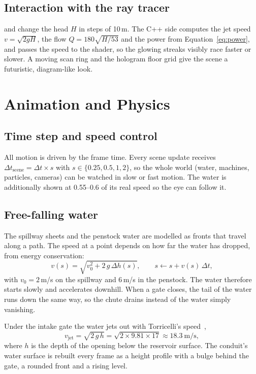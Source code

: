 \documentclass[11pt,a4paper]{report}
\newcommand{\key}[1]{\fbox{\footnotesize\ttfamily #1}}
\begin{document}
\subsection{Interaction with the ray tracer}

\key{UP} and \key{DOWN} change the head $H$ in steps of 10\,m. The C++ side computes
the jet speed $v = \sqrt{2gH}$, the flow $Q = 180\sqrt{H/53}$ and the power from
Equation~\eqref{eq:power}, and passes the speed to the shader, so the glowing streaks
visibly race faster or slower. A moving scan ring and the hologram floor grid give the
scene a futuristic, diagram-like look.

\section{Animation and Physics}

\subsection{Time step and speed control}

All motion is driven by the frame time. Every scene update receives
$\Delta t_{\text{scene}} = \Delta t \times s$ with $s\in\{0.25, 0.5, 1, 2\}$, so the
whole world (water, machines, particles, cameras) can be watched in slow or fast
motion. The water is additionally shown at 0.55--0.6 of its real speed so the eye can
follow it.

\subsection{Free-falling water}

The spillway sheets and the penstock water are modelled as fronts that travel along a
path. The speed at a point depends on how far the water has dropped, from energy
conservation:
\begin{equation}
v(s) = \sqrt{v_0^2 + 2\,g\,\Delta h(s)},\qquad s \leftarrow s + v(s)\,\Delta t ,
\end{equation}
with $v_0 = 2$\,m/s on the spillway and $6$\,m/s in the penstock. The water therefore
starts slowly and accelerates downhill. When a gate closes, the tail of the water runs
down the same way, so the chute drains instead of the water simply vanishing.

Under the intake gate the water jets out with Torricelli's speed~\cite{white},
\begin{equation}
v_{\text{jet}} = \sqrt{2\,g\,h} = \sqrt{2 \times 9.81 \times 17} \approx 18.3\ \text{m/s},
\end{equation}
where $h$ is the depth of the opening below the reservoir surface. The conduit's water
surface is rebuilt every frame as a height profile with a bulge behind the gate, a
rounded front and a rising level.
\end{document}
